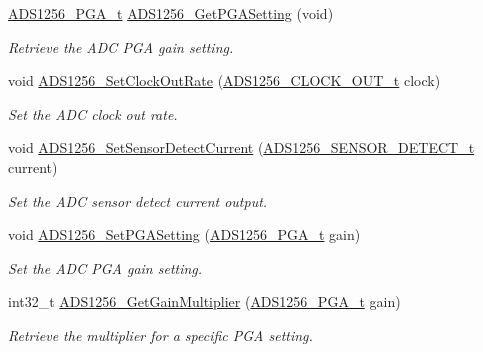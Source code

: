 \begin{DoxyCompactItemize}
\item 
\hyperlink{group__ads1256__driver_gace2e231df7cd3598eb26d5ff51171701}{A\-D\-S1256\-\_\-\-P\-G\-A\-\_\-t} \hyperlink{group__ads1256__driver_gab8cdcd9e7ab992e068f8b008c138f4e1}{A\-D\-S1256\-\_\-\-Get\-P\-G\-A\-Setting} (void)
\begin{DoxyCompactList}\small\item\em Retrieve the A\-D\-C P\-G\-A gain setting. \end{DoxyCompactList}\item 
void \hyperlink{group__ads1256__driver_ga8354e6ff9be09b89afcac3c5fcbd3083}{A\-D\-S1256\-\_\-\-Set\-Clock\-Out\-Rate} (\hyperlink{group__ads1256__driver_ga2d683909a58aa0617ee7c5d06d0a489f}{A\-D\-S1256\-\_\-\-C\-L\-O\-C\-K\-\_\-\-O\-U\-T\-\_\-t} clock)
\begin{DoxyCompactList}\small\item\em Set the A\-D\-C clock out rate. \end{DoxyCompactList}\item 
void \hyperlink{group__ads1256__driver_gae179dd8d2feace96c296cdff466225dc}{A\-D\-S1256\-\_\-\-Set\-Sensor\-Detect\-Current} (\hyperlink{group__ads1256__driver_gaa3102e98865ba4e72463676779cd62d4}{A\-D\-S1256\-\_\-\-S\-E\-N\-S\-O\-R\-\_\-\-D\-E\-T\-E\-C\-T\-\_\-t} current)
\begin{DoxyCompactList}\small\item\em Set the A\-D\-C sensor detect current output. \end{DoxyCompactList}\item 
void \hyperlink{group__ads1256__driver_gabd0d17a03fdddefb2d8cf04ad304a49d}{A\-D\-S1256\-\_\-\-Set\-P\-G\-A\-Setting} (\hyperlink{group__ads1256__driver_gace2e231df7cd3598eb26d5ff51171701}{A\-D\-S1256\-\_\-\-P\-G\-A\-\_\-t} gain)
\begin{DoxyCompactList}\small\item\em Set the A\-D\-C P\-G\-A gain setting. \end{DoxyCompactList}\item 
int32\-\_\-t \hyperlink{group__ads1256__driver_ga853d2d710efae91bb12c6cb17d562459}{A\-D\-S1256\-\_\-\-Get\-Gain\-Multiplier} (\hyperlink{group__ads1256__driver_gace2e231df7cd3598eb26d5ff51171701}{A\-D\-S1256\-\_\-\-P\-G\-A\-\_\-t} gain)
\begin{DoxyCompactList}\small\item\em Retrieve the multiplier for a specific P\-G\-A setting. \end{DoxyCompactList}\item 

\end{DoxyCompactItemize}
